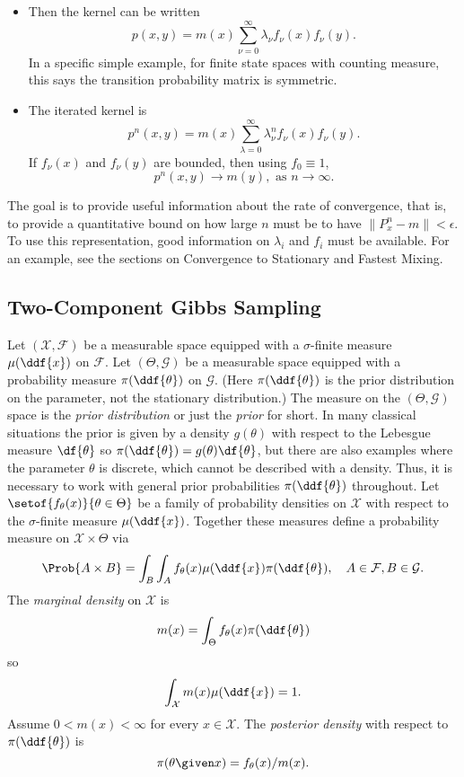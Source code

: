 \documentclass[12pt]{article}
\begin{document}
\begin{itemize}
    \item
        Then the kernel can be written
        \[
            p(x,y) = m(x) \sum\limits_{\nu=0}^{\infty}\lambda_{\nu} f_{\nu}
            (x)f_{\nu}(y).
        \] In a specific simple example, for finite state spaces with
        counting measure, this says the transition probability matrix is
        symmetric.
    \item
        The iterated kernel is
        \[
            p^n(x,y) = m(x) \sum\limits_{\lambda=0}^{\infty}\lambda_{\nu}^n
            f_{\nu}(x)f_{\nu}(y).
        \] If \( f_{\nu}(x) \) and \( f_{\nu}(y) \) are bounded, then
        using \( f_0 \equiv 1 \),
        \[
            p^n(x,y) \to m(y), \text{ as } n \to \infty.
        \]
\end{itemize}

The goal is to provide useful information about the rate of convergence,
that is, to provide a quantitative bound on how large \( n \) must be to
have \( \| P^n_x - m \| < \epsilon \).  To use this representation, good
information on \( \lambda_{i} \) and \( f_i \) must be available.  For
an example, see the sections on Convergence to Stationary and Fastest
Mixing.

\subsection*{Two-Component Gibbs Sampling}

Let \( (\mathcal{X}, \mathcal{F}) \) be a measurable space equipped with
a \( \sigma \)-finite measure \( \mu(\ddf{x}) \) on \( \mathcal{F} \).
Let \( (\Theta, \mathcal{G}) \) be a measurable space equipped with a
probability measure \( \pi(\ddf{\theta}) \) on \( \mathcal{G} \).  (Here
\( \pi(\ddf{\theta}) \) is the prior distribution on the parameter, not
the stationary distribution.) The measure on the \( (\Theta, \mathcal{G})
\) space is the \emph{prior distribution}%
or just the \emph{prior} for short.  In many classical situations the
prior is given by a density \( g(\theta) \) with respect to the Lebesgue
measure \( \df{\theta} \) so \( \pi(\ddf{\theta}) = g(\theta) \df{\theta}
\), but there are also examples where the parameter \( \theta \) is
discrete, which cannot be described with a density.  Thus, it is
necessary to work with general prior probabilities \( \pi(\ddf {\theta})
\) throughout.  Let \( \setof{f_{\theta}(x)}{\theta \in \Theta } \) be a
family of probability densities on \( \mathcal{X} \) with respect to the
\( \sigma \)-finite measure \( \mu(\ddf{x}) \).  Together these measures
define a probability measure on \( \mathcal{X} \times \Theta \) via
\[
    \Prob{A \times B} = \int_B \int_A f_{\theta}(x) \mu(\ddf{x})\pi(\ddf
    {\theta}), \quad A \in \mathcal{F} , B \in \mathcal{G}.
\] The \emph{marginal density}%
on \( \mathcal{X} \) is
\[
    m(x) = \int_{\Theta} f_{\theta}(x) \pi(\ddf{\theta})
\] so
\[
    \int_{\mathcal{X}} m(x) \mu(\ddf{x} ) = 1.
\] Assume \( 0 < m(x) < \infty \) for every \( x \in \mathcal{X} \).
The \emph{posterior density}%
with respect to \( \pi(\ddf{\theta}) \) is
\[
    \pi(\theta \given x) = f_{\theta}(x)/m(x).
\]
\end{document}
